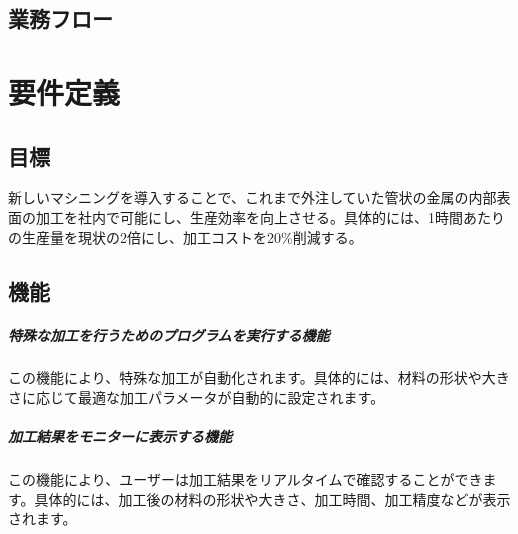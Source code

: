 \section{業務フロー}



\chapter{要件定義}



\section{目標}
新しいマシニングを導入することで、これまで外注していた管状の金属の内部表面の加工を社内で可能にし、生産効率を向上させる。具体的には、1時間あたりの生産量を現状の2倍にし、加工コストを20\%削減する。



\section{機能}
\paragraph{特殊な加工を行うためのプログラムを実行する機能}
この機能により、特殊な加工が自動化されます。具体的には、材料の形状や大きさに応じて最適な加工パラメータが自動的に設定されます。

\paragraph{加工結果をモニターに表示する機能}
この機能により、ユーザーは加工結果をリアルタイムで確認することができます。具体的には、加工後の材料の形状や大きさ、加工時間、加工精度などが表示されます。

